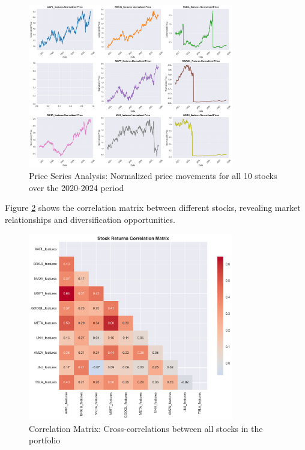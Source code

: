 \documentclass[11pt]{article}
\begin{document}
\begin{figure}[H]
\centering
\includegraphics[width=0.8\textwidth]{figures/eda_price_series.png}
\caption{Price Series Analysis: Normalized price movements for all 10 stocks over the 2020-2024 period}
\label{fig:price_series}
\end{figure}

Figure \ref{fig:correlation_matrix} shows the correlation matrix between different stocks, revealing market relationships and diversification opportunities.

\begin{figure}[H]
\centering
\includegraphics[width=0.8\textwidth]{figures/eda_correlation_matrix.png}
\caption{Correlation Matrix: Cross-correlations between all stocks in the portfolio}
\label{fig:correlation_matrix}
\end{figure}
\end{document}
